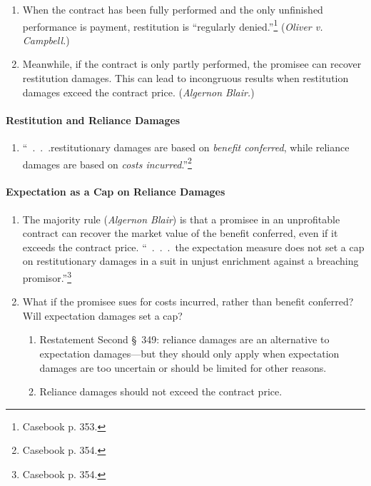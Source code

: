 \begin{enumerate}
    \item When the contract has been fully performed and the only unfinished 
    performance is payment, restitution is ``regularly 
    denied.''\footnote{Casebook p. 353.} (\emph{Oliver v. Campbell.})
    \item Meanwhile, if the contract is only partly performed, the promisee 
    can recover restitution damages. This can lead to incongruous results when 
    restitution damages exceed the contract price. (\emph{Algernon Blair.})
\end{enumerate}

\paragraph{Restitution and Reliance Damages}

\begin{enumerate}
    \item ``~.~.~.restitutionary damages are based on \emph{benefit 
    conferred}, while reliance damages are based on \emph{costs 
    incurred}.''\footnote{Casebook p. 354.}
\end{enumerate}

\paragraph{Expectation as a Cap on Reliance Damages}

\begin{enumerate}
    \item The majority rule (\emph{Algernon Blair}) is that a promisee in an 
    unprofitable contract can recover the market value of the benefit 
    conferred, even if it exceeds the contract price. ``~.~.~.~the expectation 
    measure does not set a cap on restitutionary damages in a suit in unjust 
    enrichment against a breaching promisor.''\footnote{Casebook p. 354.}
    \item What if the promisee sues for costs incurred, rather than benefit 
    conferred? Will expectation damages set a cap?
    \begin{enumerate}
        \item Restatement Second \S\ 349: reliance damages are an alternative 
        to expectation damages---but they should only apply when expectation 
        damages are too uncertain or should be limited for other reasons.
        \item Reliance damages should not exceed the contract price.
    \end{enumerate}
\end{enumerate}

